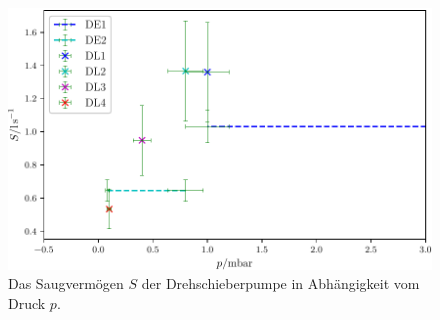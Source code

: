 \begin{figure}
\centering
\includegraphics[width=\linewidth-70pt,height=\textheight-70pt,keepaspectratio]{content/images/DGes.pdf}
\caption{Das Saugvermögen $S$ der Drehschieberpumpe in Abhängigkeit vom Druck $p$.}
\label{fig:DGes}
\end{figure}
